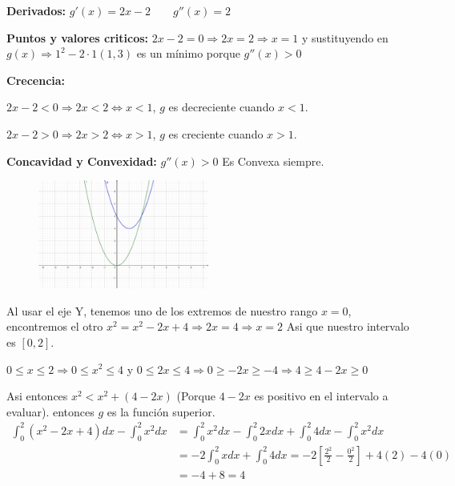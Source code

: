 \documentclass[12pt]{article}
\begin{document}
\begin{enumerate}[\hspace{9px} a)]
        \textbf{Derivados: }\(g'(x)=2x-2 \qquad g''(x)=2\)\medskip

        \textbf{Puntos y valores criticos: } \(2x-2=0\Rightarrow 2x=2\Rightarrow x=1\) y sustituyendo en \(g(x)\Rightarrow 1^2-2\cdot1\)\((1,3)\) es un m\'inimo porque \(g''(x)>0\)\medskip

        \textbf{Crecencia: }\medskip
        
        \(2x-2<0\Rightarrow 2x<2\Leftrightarrow x<1\), $g$ es decreciente cuando \(x<1\).\medskip

        \(2x-2>0\Rightarrow 2x>2\Leftrightarrow x>1\), $g$ es creciente cuando \(x>1\).\medskip

        \textbf{Concavidad y Convexidad: }\(g''(x)>0\) Es Convexa siempre.\bigskip

        \begin{figure}[ht]
            \centering
            \includegraphics[width=0.5\textwidth]{7-d}
        \end{figure}

        Al usar el eje Y, tenemos uno de los extremos de nuestro rango \(x=0\), encontremos el otro \(x^2 = x^2-2x+4\Rightarrow 2x=4\Rightarrow x=2\) Asi que nuestro intervalo es \([0,2]\).\medskip

        \(0\leq x\leq2 \Longrightarrow 0\leq x^2\leq 4\) y \(0\leq2x\leq4 \Longrightarrow 0\geq -2x\geq -4 \Longrightarrow 4\geq 4-2x\geq 0\)\medskip

        Asi entonces \(x^2<x^2+(4-2x)\) (Porque \(4-2x\) es positivo en el intervalo a evaluar). entonces \(g\) es la funci\'on superior.
        \begin{align*}
            \int_{0}^{2}(x^2-2x+4)dx-\int_{0}^{2}x^2dx &= \int_{0}^{2}x^2dx -\int_{0}^{2}2xdx +\int_{0}^{2}4dx -\int_{0}^{2}x^2dx \\
            &= -2\int_{0}^{2}xdx +\int_{0}^{2}4dx = -2\left[\frac{2^2}{2}-\frac{0^2}{2}\right]+4(2)-4(0)\\
            &= -4+8=4
        \end{align*}

\end{enumerate}
\end{document}
